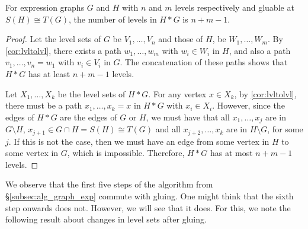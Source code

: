 \documentclass[./Thick_TQFTs_and_Quantum_Information.tex]{subfiles}
\begin{document}
\begin{lem}
For expression graphs $G$ and $H$ with $n$ and $m$ levels respectively and
gluable at $S(H) \cong T(G)$, the number of levels in $H * G$ is $n + m - 1$.
\end{lem}
\begin{proof}
Let the level sets of $G$ be $V_1, \dots, V_n$ and
those of $H$, be $W_1, \dots, W_m$. By \ref{cor:lvltolvl}, there exists a path
$w_1, \dots, w_m$ with $w_i \in W_i$ in $H$, and also a path
$v_1, \dots, v_n = w_1$ with $v_i \in V_i$ in $G$. The concatenation of these
paths shows that $H * G$ has at least $n + m - 1$ levels.

Let $X_1, \dots, X_k$ be the level sets of $H * G$. For any vertex
$x \in X_k$, by \ref{cor:lvltolvl}, there must be a path $x_1, \dots, x_k = x$
in $H * G$ with $x_i \in X_i$. However, since the edges of $H * G$ are the edges
of $G$ or $H$, we must have that all $x_1, \dots, x_{j}$ are in
$G \setminus H$, $x_{j + 1} \in G \cap H = S(H) \cong T(G)$ and all
$x_{j + 2}, \dots, x_k$ are in $H \setminus G$, for some $j$. If this is
not the case, then we must have an edge from some vertex in $H$ to some vertex
in $G$, which is impossible. Therefore, $H * G$ has at most $n + m - 1$ levels.
\end{proof}

We observe that the first five steps of the algorithm from
\S\ref{subsec:alg_graph_exp} commute with gluing. One might think that the sixth
step onwards does not. However, we will see that it does. For this, we note the
following result about changes in level sets after gluing.
\end{document}
